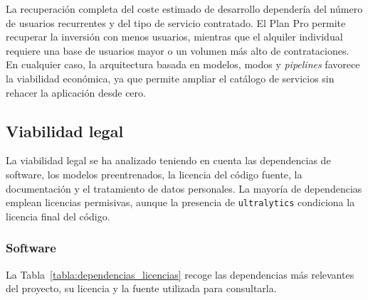 La recuperación completa del coste estimado de desarrollo dependería del número de usuarios recurrentes y del tipo de servicio contratado. El Plan Pro permite recuperar la inversión con menos usuarios, mientras que el alquiler individual requiere una base de usuarios mayor o un volumen más alto de contrataciones. En cualquier caso, la arquitectura basada en modelos, modos y \textit{pipelines} favorece la viabilidad económica, ya que permite ampliar el catálogo de servicios sin rehacer la aplicación desde cero.




\subsection{Viabilidad legal}

La viabilidad legal se ha analizado teniendo en cuenta las dependencias de software, los modelos preentrenados, la licencia del código fuente, la documentación y el tratamiento de datos personales. La mayoría de dependencias emplean licencias permisivas, aunque la presencia de \texttt{ultralytics} condiciona la licencia final del código.

\subsubsection{Software}

La Tabla~\ref{tabla:dependencias_licencias} recoge las dependencias más relevantes del proyecto, su licencia y la fuente utilizada para consultarla.

